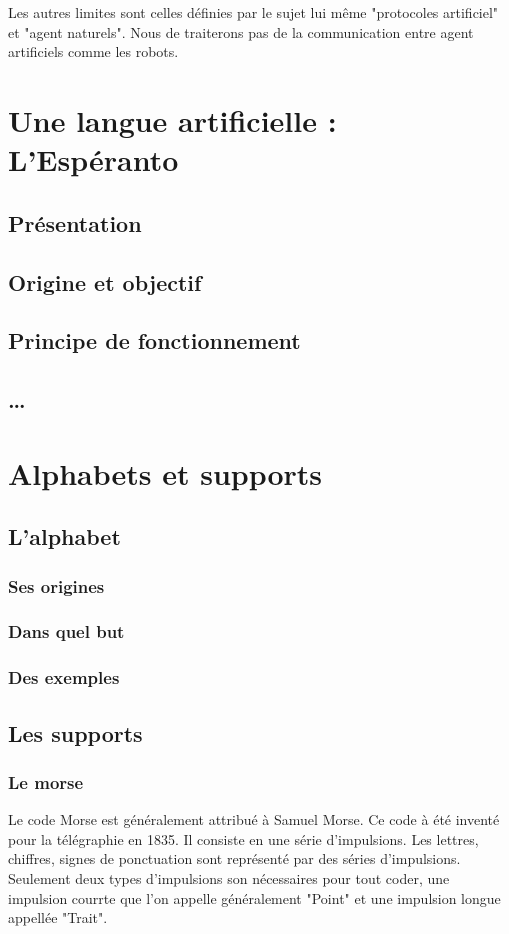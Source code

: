 \documentclass[french,a4paper]{article}
\begin{document}
Les autres limites sont celles définies par le sujet lui même 
"protocoles artificiel" et "agent naturels". Nous de traiterons pas de 
la communication entre agent artificiels comme les robots.

\newpage
\section{Une langue artificielle : L'Espéranto}
\subsection{Présentation}
\subsection{Origine et objectif}
\subsection{Principe de fonctionnement}
\subsection{…}

\section{Alphabets et supports}
\subsection{L'alphabet}
\subsubsection{Ses origines}
\subsubsection{Dans quel but}
\subsubsection{Des exemples}

\subsection{Les supports}
\subsubsection{Le morse}
Le code Morse est généralement attribué à Samuel Morse. Ce code à été inventé pour la télégraphie en 1835.
Il consiste en une série d'impulsions. Les lettres, chiffres, signes de ponctuation sont représenté par des séries d'impulsions.
Seulement deux types d'impulsions son nécessaires pour tout coder, une impulsion courrte que l'on appelle généralement
"Point" et une impulsion longue appellée "Trait".
\end{document}
